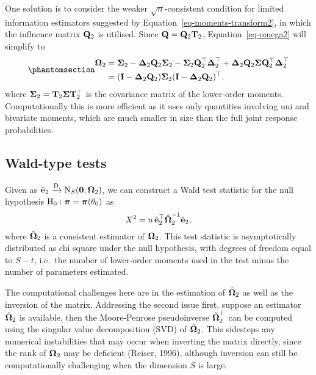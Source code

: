 \documentclass[
  letterpaper,
  DIV=11,
  numbers=noendperiod]{scrartcl}
\begin{document}
One solution is to consider the weaker \(\sqrt n\)-consistent condition
for limited information estimators suggested by
Equation~\ref{eq-moments-transform2}, in which the influence matrix
\({\mathbf Q}_2\) is utilised. Since \({\mathbf Q} = {\mathbf Q}_2 {\mathbf T}_2\),
Equation~\ref{eq-omega2} will simplify to
\begin{equation}\phantomsection\label{eq-omega2alt}{
\begin{aligned}
\bOmega_2 
  &= \bSigma_2 
  - \bDelta_{2} \bQ_2 \bSigma_2
  - \bSigma_2  \bQ_2^\top \bDelta_{2}^\top
  + \bDelta_{2} \bQ_2 \bSigma \bQ_2^\top \bDelta_{2}^\top \\
  &= (\bI - \bDelta_{2} \bQ_2) \bSigma_2 (\bI - \bDelta_{2}\bQ_2)^\top.
\end{aligned}
}\end{equation} where \({\boldsymbol\Sigma}_2 = {\mathbf T}_2 {\boldsymbol\Sigma} {\mathbf T}_2^\top\) is the
covariance matrix of the lower-order moments. Computationally this is
more efficient as it uses only quantities involving uni and bivariate
moments, which are much smaller in size than the full joint response
probabilities.

\subsection{Wald-type tests}\label{wald-type-tests}

Given as \(\hat{{\mathbf e}}_2 \xrightarrow{\text D} \operatorname{N}_S({\mathbf 0}, {\boldsymbol\Omega}_2)\), we
can construct a Wald test statistic for the null hypothesis
\(\text{H}_0: {\boldsymbol\pi} = {\boldsymbol\pi}(\theta_0)\) as \[
X^2 = n \, \hat{{\mathbf e}}_2^\top \hat{{\boldsymbol\Omega}}_2^{-1} \hat{{\mathbf e}}_2,
\] where \(\hat{{\boldsymbol\Omega}}_2\) is a consistent estimator of \({\boldsymbol\Omega}_2\).
This test statistic is asymptotically distributed as chi square under
the null hypothesis, with degrees of freedom equal to \(S-t\), i.e.~the
number of lower-order moments used in the test minus the number of
parameters estimated.

The computational challenges here are in the estimation of
\(\hat{{\boldsymbol\Omega}}_2\) as well as the inversion of the matrix. Addressing the
second issue first, suppose an estimator \(\hat{{\boldsymbol\Omega}}_2\) is available,
then the Moore-Penrose pseudoinverse \(\hat{{\boldsymbol\Omega}}_2^+\) can be computed
using the singular value decomposition (SVD) of \(\hat{{\boldsymbol\Omega}}_2\). This
sidesteps any numerical instabilities that may occur when inverting the
matrix directly, since the rank of \({\boldsymbol\Omega}_2\) may be deficient
(Reiser, 1996), although inversion can still be computationally
challenging when the dimension \(S\) is large.
\end{document}
